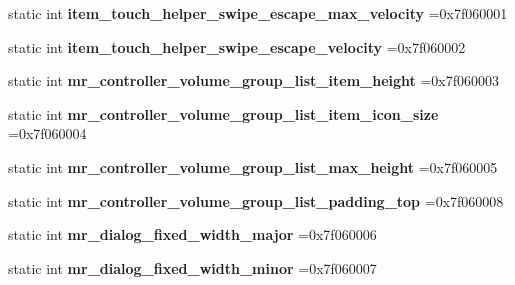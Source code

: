 \begin{DoxyCompactItemize}
static int {\bfseries item\+\_\+touch\+\_\+helper\+\_\+swipe\+\_\+escape\+\_\+max\+\_\+velocity} =0x7f060001
\item 
\mbox{\label{classandroid_1_1support_1_1v7_1_1mediarouter_1_1R_1_1dimen_ac356535238843f2b4d0390eefabbb48f}} 
static int {\bfseries item\+\_\+touch\+\_\+helper\+\_\+swipe\+\_\+escape\+\_\+velocity} =0x7f060002
\item 
\mbox{\label{classandroid_1_1support_1_1v7_1_1mediarouter_1_1R_1_1dimen_ab5553e1a59f643eb94e50ac2eaa242e7}} 
static int {\bfseries mr\+\_\+controller\+\_\+volume\+\_\+group\+\_\+list\+\_\+item\+\_\+height} =0x7f060003
\item 
\mbox{\label{classandroid_1_1support_1_1v7_1_1mediarouter_1_1R_1_1dimen_a6b25c9ea76cc31a51d865d119f8cb00c}} 
static int {\bfseries mr\+\_\+controller\+\_\+volume\+\_\+group\+\_\+list\+\_\+item\+\_\+icon\+\_\+size} =0x7f060004
\item 
\mbox{\label{classandroid_1_1support_1_1v7_1_1mediarouter_1_1R_1_1dimen_ab30558fb437414ee00d8d3fde944f3fc}} 
static int {\bfseries mr\+\_\+controller\+\_\+volume\+\_\+group\+\_\+list\+\_\+max\+\_\+height} =0x7f060005
\item 
\mbox{\label{classandroid_1_1support_1_1v7_1_1mediarouter_1_1R_1_1dimen_abd758be372e57e970922e46fe3a50857}} 
static int {\bfseries mr\+\_\+controller\+\_\+volume\+\_\+group\+\_\+list\+\_\+padding\+\_\+top} =0x7f060008
\item 
\mbox{\label{classandroid_1_1support_1_1v7_1_1mediarouter_1_1R_1_1dimen_ab3ff2840f019a7669c883f5bde2e6b1f}} 
static int {\bfseries mr\+\_\+dialog\+\_\+fixed\+\_\+width\+\_\+major} =0x7f060006
\item 
\mbox{\label{classandroid_1_1support_1_1v7_1_1mediarouter_1_1R_1_1dimen_afc1368b1e8554217b06fe4ad61cca359}} 
static int {\bfseries mr\+\_\+dialog\+\_\+fixed\+\_\+width\+\_\+minor} =0x7f060007

\end{DoxyCompactItemize}
